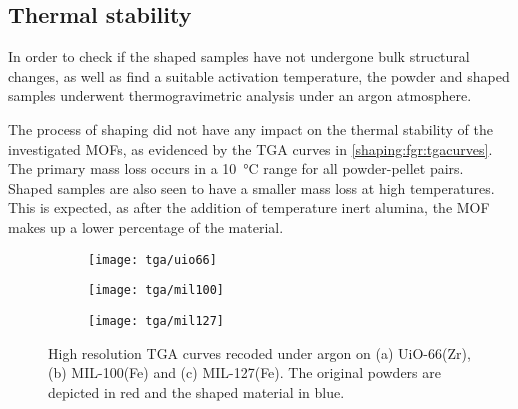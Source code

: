 
\subsection{Thermal stability}

In order to check if the shaped samples have not undergone bulk
structural changes, as well as find a suitable activation temperature,
the powder and shaped samples underwent thermogravimetric analysis
under an argon atmosphere.

The process of shaping did not have any impact on the thermal stability of
the investigated MOFs, as evidenced by the TGA curves in
\autoref{shaping:fgr:tgacurves}. The primary mass loss occurs
in a \SI{10}{\degreeCelsius} range for all powder-pellet pairs.
Shaped samples are also seen to have a smaller mass loss
at high temperatures. This is expected, as after the addition of
temperature inert alumina, the MOF makes up a lower percentage of
the material.

\begin{figure}
	\centering
	\begin{subfigure}{0.85\textwidth}
		\parbox[c]{0.1\linewidth}{\caption{}\label{shaping:fgr:tgauio66}}%
		\parbox[b]{0.7\linewidth}{%
			\texttt{[image: tga/uio66]}%
		}%
	\end{subfigure}
	\begin{subfigure}{0.85\textwidth}
		\parbox[c]{0.1\linewidth}{\caption{}\label{shaping:fgr:tgamil100}}%
		\parbox[b]{0.7\linewidth}{%
			\texttt{[image: tga/mil100]}%
		}%
	\end{subfigure}
	\begin{subfigure}{0.85\textwidth}
		\parbox[c]{0.1\linewidth}{\caption{}\label{shaping:fgr:tgamil127}}%
		\parbox[b]{0.7\linewidth}{%
			\texttt{[image: tga/mil127]}%
		}%
	\end{subfigure}

	\caption{High resolution TGA curves recoded under argon
		on (a) UiO-66(Zr), (b) MIL-100(Fe) and (c) MIL-127(Fe). The
		original powders are depicted in red and the shaped material
		in blue.}%
	\label{shaping:fgr:tgacurves}

\end{figure}
